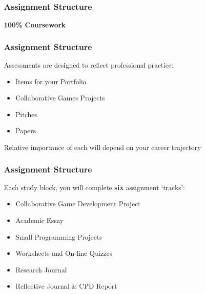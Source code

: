 \begin{frame}
	\frametitle{Assignment Structure}
	
	\begin{Huge}
		\begin{center}
			\textbf{100\% Coursework}
		\end{center}
	\end{Huge}

\end{frame}

\begin{frame}
	\frametitle{Assignment Structure}
	
	
	Assessments are designed to reflect professional practice:
	
	\begin{itemize}
		\item Items for your Portfolio
		\item Collaborative Games Projects
		\item Pitches
		\item Papers
	\end{itemize}

	Relative importance of each will depend on your career trajectory

\end{frame}











\begin{frame}
	\frametitle{Assignment Structure}
	
	Each study block, you will complete \textbf{six} assignment `tracks':
	
	\begin{itemize}
		\item Collaborative Game Development Project
		\item Academic Essay
		\item Small Programming Projects
		\item Worksheets and On-line Quizzes
		\item Research Journal
		\item Reflective Journal \& CPD Report
	\end{itemize}

\end{frame}

